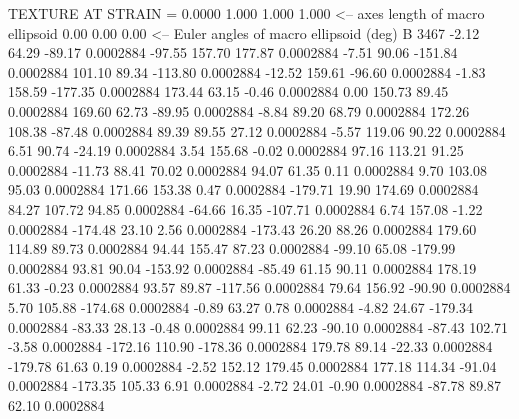 TEXTURE AT STRAIN =    0.0000
   1.000   1.000   1.000  <-- axes length of macro ellipsoid
    0.00    0.00    0.00  <-- Euler angles of macro ellipsoid (deg)
B      3467
       -2.12       64.29      -89.17     0.0002884
      -97.55      157.70      177.87     0.0002884
       -7.51       90.06     -151.84     0.0002884
      101.10       89.34     -113.80     0.0002884
      -12.52      159.61      -96.60     0.0002884
       -1.83      158.59     -177.35     0.0002884
      173.44       63.15       -0.46     0.0002884
        0.00      150.73       89.45     0.0002884
      169.60       62.73      -89.95     0.0002884
       -8.84       89.20       68.79     0.0002884
      172.26      108.38      -87.48     0.0002884
       89.39       89.55       27.12     0.0002884
       -5.57      119.06       90.22     0.0002884
        6.51       90.74      -24.19     0.0002884
        3.54      155.68       -0.02     0.0002884
       97.16      113.21       91.25     0.0002884
      -11.73       88.41       70.02     0.0002884
       94.07       61.35        0.11     0.0002884
        9.70      103.08       95.03     0.0002884
      171.66      153.38        0.47     0.0002884
     -179.71       19.90      174.69     0.0002884
       84.27      107.72       94.85     0.0002884
      -64.66       16.35     -107.71     0.0002884
        6.74      157.08       -1.22     0.0002884
     -174.48       23.10        2.56     0.0002884
     -173.43       26.20       88.26     0.0002884
      179.60      114.89       89.73     0.0002884
       94.44      155.47       87.23     0.0002884
      -99.10       65.08     -179.99     0.0002884
       93.81       90.04     -153.92     0.0002884
      -85.49       61.15       90.11     0.0002884
      178.19       61.33       -0.23     0.0002884
       93.57       89.87     -117.56     0.0002884
       79.64      156.92      -90.90     0.0002884
        5.70      105.88     -174.68     0.0002884
       -0.89       63.27        0.78     0.0002884
       -4.82       24.67     -179.34     0.0002884
      -83.33       28.13       -0.48     0.0002884
       99.11       62.23      -90.10     0.0002884
      -87.43      102.71       -3.58     0.0002884
     -172.16      110.90     -178.36     0.0002884
      179.78       89.14      -22.33     0.0002884
     -179.78       61.63        0.19     0.0002884
       -2.52      152.12      179.45     0.0002884
      177.18      114.34      -91.04     0.0002884
     -173.35      105.33        6.91     0.0002884
       -2.72       24.01       -0.90     0.0002884
      -87.78       89.87       62.10     0.0002884

